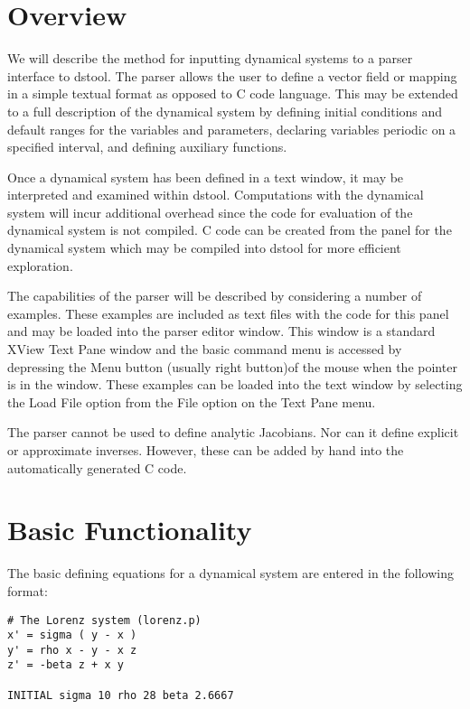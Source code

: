 \section{Overview}

We will describe the method for inputting dynamical systems
to a parser interface to dstool.  The parser allows the
user to define a vector field or mapping in a simple
textual format as opposed to C code language.  
This may be extended to a full description of the
dynamical system by defining initial conditions
and default ranges for the variables and parameters,
declaring variables periodic on a specified interval,
and defining auxiliary functions.

Once a dynamical system has been defined in a text window,
it may be interpreted and examined within dstool.  Computations
with the dynamical system will incur additional
overhead since the code for evaluation of the dynamical
system is not compiled.  
C code can be created from the panel for the dynamical
system which may be compiled into dstool for more
efficient exploration.

The capabilities of the parser will be described by considering
a number of examples.  These examples are included as text
files with the code for this panel and may be loaded into
the parser editor window.  This window is a standard XView 
Text Pane window and the basic command menu is accessed
by depressing the Menu button (usually right button)of
the mouse when the pointer is in the window.  These
examples can be loaded into the text window by selecting
the Load File option from the File option on the Text Pane
menu.

The parser cannot be used to define analytic
Jacobians.  Nor can it define explicit or approximate
inverses.  However, these can be added by hand into the automatically
generated C code.


\section{Basic Functionality}

The basic defining equations for a dynamical system are
entered in the following format:

\begin{verbatim}
# The Lorenz system (lorenz.p)
x' = sigma ( y - x ) 
y' = rho x - y - x z
z' = -beta z + x y

INITIAL sigma 10 rho 28 beta 2.6667
\end{verbatim}

